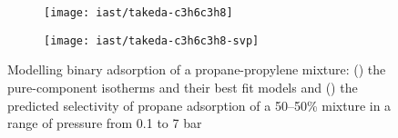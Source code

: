 \begin{figure}[htb]

    \centering
    \begin{subfigure}[b]{.42\textwidth}
        \texttt{[image: iast/takeda-c3h6c3h8]}
        \caption{}%
        \label{pyg:fig:takedac3h6c3h8iso}
    \end{subfigure}
    \begin{subfigure}[b]{.4\textwidth}
        \texttt{[image: iast/takeda-c3h6c3h8-svp]}
        \caption{}%
        \label{pyg:fig:takedac3h6c3h8iast}
    \end{subfigure}
    \caption{%
    Modelling binary adsorption of a propane-propylene mixture: 
    (\protect{}) the pure-component
    isotherms and their best fit models and 
    (\protect{})
    the predicted selectivity of propane adsorption 
    of a 50--50\% mixture in a range of pressure from 0.1 to 7 bar}%
    \label{pyg:fig:takedac3h6c3h8}

\end{figure}